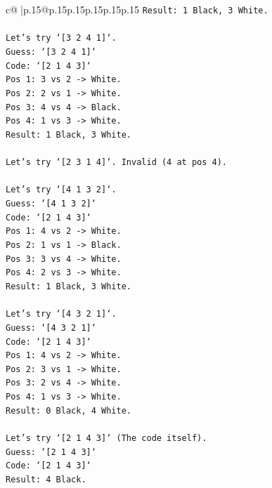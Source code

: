 \documentclass{article}
\begin{document}
{\begin{supertabular}{c@{$\;$}|p{.15\linewidth}@{}p{.15\linewidth}p{.15\linewidth}p{.15\linewidth}p{.15\linewidth}p{.15\linewidth}}
{{{\texttt{Result: 1 Black, 3 White.} \\
\\ 
\texttt{Let's try `{[}3 2 4 1{]}`.} \\
\texttt{Guess: `{[}3 2 4 1{]}`} \\
\texttt{Code: `{[}2 1 4 3{]}`} \\
\texttt{Pos 1: 3 vs 2 {-}> White.} \\
\texttt{Pos 2: 2 vs 1 {-}> White.} \\
\texttt{Pos 3: 4 vs 4 {-}> Black.} \\
\texttt{Pos 4: 1 vs 3 {-}> White.} \\
\texttt{Result: 1 Black, 3 White.} \\
\\ 
\texttt{Let's try `{[}2 3 1 4{]}`. Invalid (4 at pos 4).} \\
\\ 
\texttt{Let's try `{[}4 1 3 2{]}`.} \\
\texttt{Guess: `{[}4 1 3 2{]}`} \\
\texttt{Code: `{[}2 1 4 3{]}`} \\
\texttt{Pos 1: 4 vs 2 {-}> White.} \\
\texttt{Pos 2: 1 vs 1 {-}> Black.} \\
\texttt{Pos 3: 3 vs 4 {-}> White.} \\
\texttt{Pos 4: 2 vs 3 {-}> White.} \\
\texttt{Result: 1 Black, 3 White.} \\
\\ 
\texttt{Let's try `{[}4 3 2 1{]}`.} \\
\texttt{Guess: `{[}4 3 2 1{]}`} \\
\texttt{Code: `{[}2 1 4 3{]}`} \\
\texttt{Pos 1: 4 vs 2 {-}> White.} \\
\texttt{Pos 2: 3 vs 1 {-}> White.} \\
\texttt{Pos 3: 2 vs 4 {-}> White.} \\
\texttt{Pos 4: 1 vs 3 {-}> White.} \\
\texttt{Result: 0 Black, 4 White.} \\
\\ 
\texttt{Let's try `{[}2 1 4 3{]}` (The code itself).} \\
\texttt{Guess: `{[}2 1 4 3{]}`} \\
\texttt{Code: `{[}2 1 4 3{]}`} \\
\texttt{Result: 4 Black.} \\
\\ 
}}}
\end{supertabular}}
\end{document}
